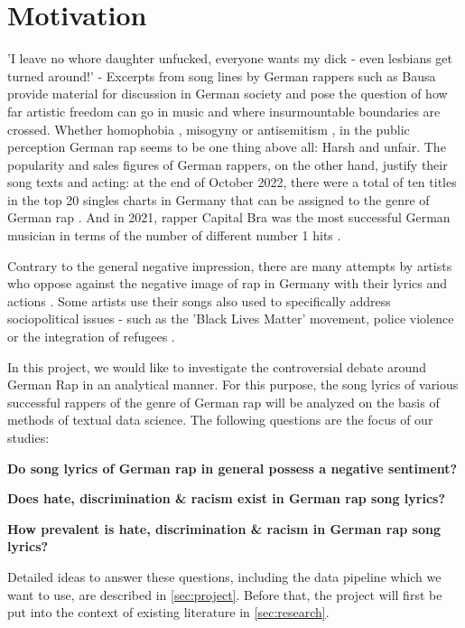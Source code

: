 \section{Motivation}\label{sec:motivation}
'I leave no whore daughter unfucked, everyone wants my dick - even lesbians get turned around!' - Excerpts from song lines by German rappers such as Bausa \cite{steffes-lay_2019} provide material for discussion in German society and pose the question of how far artistic freedom can go in music and where insurmountable boundaries are crossed. Whether homophobia \cite{steffes-lay_2019}, misogyny \cite{steffes-lay_2019} or antisemitism \cite{salomo_greven_2021}, in the public perception German rap seems to be one thing above all: Harsh and unfair. The popularity and sales figures of German rappers, on the other hand, justify their song texts and acting: at the end of October 2022, there were a total of ten titles in the top 20 singles charts in Germany that can be assigned to the genre of German rap \cite{mtv_germany_2022}. And in 2021, rapper Capital Bra was the most successful German musician in terms of the number of different number 1 hits \cite{br_2019}. 

Contrary to the general negative impression, there are many attempts by artists who oppose against the negative image of rap in Germany with their lyrics and actions \cite{Deutschlandfunk_2021}. Some artists use their songs also used to specifically address sociopolitical issues - such as the 'Black Lives Matter' movement, police violence or the integration of refugees \cite{me-redaktion_2021}.

In this project, we would like to investigate the controversial debate around German Rap in an analytical manner. For this purpose, the song lyrics of various successful rappers of the genre of German rap will be analyzed on the basis of methods of textual data science. The following questions are the focus of our studies:

\begin{questions}
    \item \textbf{Do song lyrics of German rap in general possess a negative sentiment?}
    \item \textbf{Does hate, discrimination \& racism exist in German rap song lyrics?}
    \item \textbf{How prevalent is hate, discrimination \& racism in German rap song lyrics?}
\end{questions}

Detailed ideas to answer these questions, including the data pipeline which we want to use, are described in \autoref{sec:project}. Before that, the project will first be put into the context of existing literature in \autoref{sec:research}.










